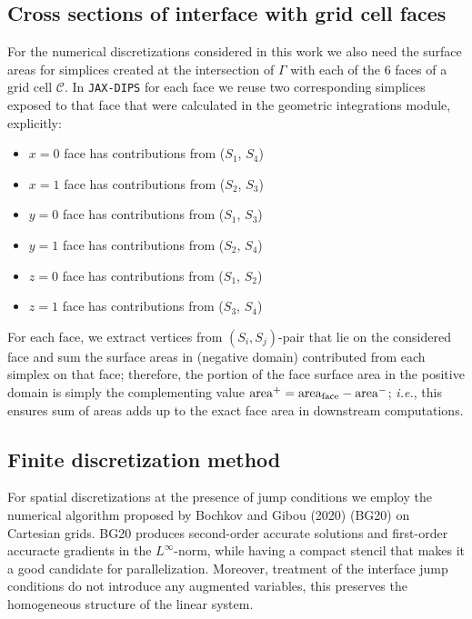 \documentclass{elsarticle}
\begin{document}
\subsection{Cross sections of interface with grid cell faces}
For the numerical discretizations considered in this work we also need the surface areas for simplices created at the intersection of $\Gamma$ with each of the 6 faces of a grid cell $\mathcal{C}$. In \texttt{JAX-DIPS} for each face we reuse two corresponding simplices exposed to that face that were calculated in the geometric integrations module, explicitly: 
\begin{itemize}
	\item $x=0$ face has contributions from ($S_1$, $S_4$)
	\item $x=1$ face has contributions from ($S_2$, $S_3$)
	\item $y=0$ face has contributions from ($S_1$, $S_3$)
	\item $y=1$ face has contributions from ($S_2$, $S_4$)
	\item $z=0$ face has contributions from ($S_1$, $S_2$)
	\item $z=1$ face has contributions from ($S_3$, $S_4$)
\end{itemize}
For each face, we extract vertices from $(S_i,S_j)$-pair that lie on the considered face and sum the surface areas in (negative domain) contributed from each simplex on that face; therefore, the portion of the face surface area in the positive domain is simply the complementing value $\rm area^+=area_{face}-area^-$; \textit{i.e.}, this ensures sum of areas adds up to the exact face area in downstream computations.







\subsection{Finite discretization method}\label{sec::FD}

For spatial discretizations at the presence of jump conditions we employ the numerical algorithm proposed by Bochkov and Gibou (2020) \cite{bochkov2020solving} (BG20) on Cartesian grids. BG20 produces second-order accurate solutions and first-order accuracte gradients in the $L^\infty$-norm, while having a compact stencil that makes it a good candidate for parallelization. Moreover, treatment of the interface jump conditions do not introduce any augmented variables, this preserves the homogeneous structure of the linear system.
\end{document}
